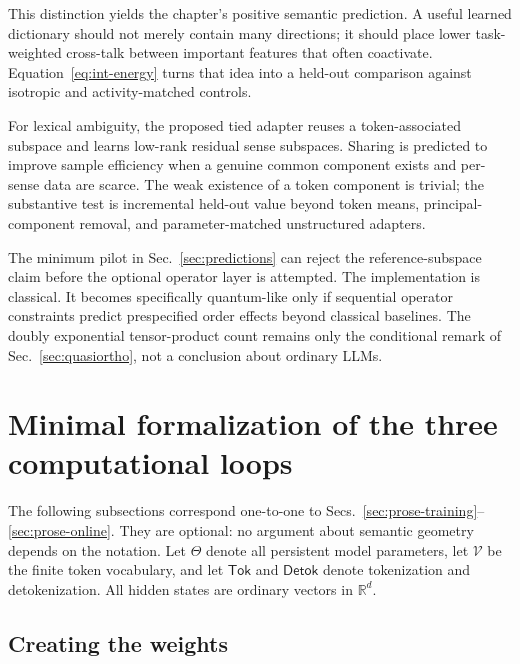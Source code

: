 \documentclass[
  aps,
  reprint,
  superscriptaddress,
  floatfix,
  nofootinbib,
  longbibliography
]{revtex4-2}
\newcommand{\R}{\mathbb{R}}
\begin{document}
This distinction yields the chapter's positive semantic prediction.  A useful
learned dictionary should not merely contain many directions; it should place
lower task-weighted cross-talk between important features that often
coactivate.  Equation~\eqref{eq:int-energy} turns that idea into a held-out
comparison against isotropic and activity-matched controls.

For lexical ambiguity, the proposed tied adapter reuses a token-associated
subspace and learns low-rank residual sense subspaces.  Sharing is predicted to
improve sample efficiency when a genuine common component exists and per-sense
data are scarce.  The weak existence of a token component is trivial; the
substantive test is incremental held-out value beyond token means,
principal-component removal, and parameter-matched unstructured adapters.

The minimum pilot in Sec.~\ref{sec:predictions} can reject the reference-subspace
claim before the optional operator layer is attempted.  The implementation is
classical.  It becomes specifically quantum-like only if sequential operator
constraints predict prespecified order effects beyond classical baselines.
The doubly exponential tensor-product count remains only the conditional
remark of Sec.~\ref{sec:quasiortho}, not a conclusion about ordinary LLMs.

\appendix

\section{Minimal formalization of the three computational loops}
\label{app:llm-loops}

The following subsections correspond one-to-one to
Secs.~\ref{sec:prose-training}--\ref{sec:prose-online}.  They are optional: no
argument about semantic geometry depends on the notation.  Let $\Theta$ denote
all persistent model parameters, let $\mathcal V$ be the finite token
vocabulary, and let $\mathsf{Tok}$ and $\mathsf{Detok}$ denote tokenization and
detokenization.  All hidden states are ordinary vectors in $\R^d$.

\subsection{Creating the weights}
\label{app:training}
\end{document}
